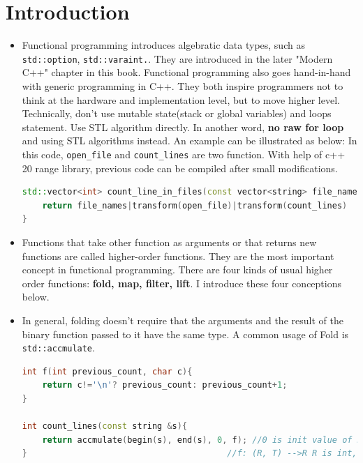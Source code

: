 \documentclass[a4paper,11pt,twoside]{book}
\begin{document}
\section{Introduction}
\begin{itemize}
	
	\item  Functional programming introduces algebratic data types, such as \texttt{std::option}, \texttt{std::varaint.}. They are introduced in the later "Modern C++" chapter in this book. Functional programming also goes hand-in-hand with generic programming in C++. They both inspire programmers not to think at the hardware and implementation level, but to move higher level. Technically, don't use mutable state(stack or global variables) and loops statement. Use STL algorithm directly. In another word,  \textbf{no raw for loop} and using STL algorithms instead. An example can be illustrated as below: In this code, \texttt{open\_file} and \texttt{count\_lines} are two function. With help of c++ 20 range library, previous code can be compiled after small modifications.   
	
\begin{lstlisting}[frame=single, language=c++]
std::vector<int> count_line_in_files(const vector<string> file_names){
	return file_names|transform(open_file)|transform(count_lines)
}
\end{lstlisting}	
		
	\item Functions that take other function as arguments or that returns new functions are called higher-order functions. They are the most important concept in functional programming. There are four kinds of usual higher order functions: \textbf{fold, map, filter, lift}. I introduce these four conceptions below.

	\item In general, folding doesn't require that the arguments and the result of the binary function passed to it have the same type. A common usage of Fold is \texttt{std::accmulate}. 
	
\begin{lstlisting}[frame=single, language=c++]
int f(int previous_count, char c){
   	return c!='\n'? previous_count: previous_count+1;
}
   
int count_lines(const string &s){
   	return accmulate(begin(s), end(s), 0, f); //0 is init value of R
}                                        //f: (R, T) -->R R is int, T is char here.
\end{lstlisting} 
		

\end{itemize}
\end{document}
